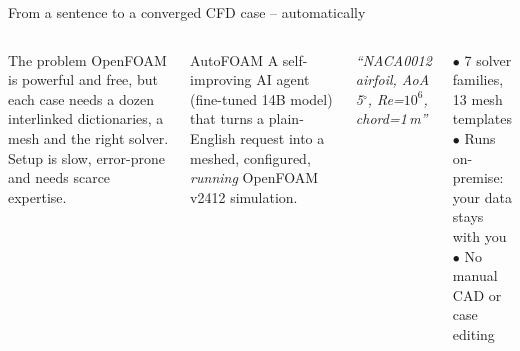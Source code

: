 \documentclass[aspectratio=169,11pt]{beamer}
\begin{document}
\begin{frame}{From a sentence to a converged CFD case -- automatically}
\begin{columns}[T]
\begin{block}{The problem}
\small OpenFOAM is powerful and free, but each case needs a dozen interlinked dictionaries, a mesh and the right solver. Setup is slow, error-prone and needs scarce expertise.
\end{block}
\begin{block}{AutoFOAM}
\small A self-improving AI agent (fine-tuned 14B model) that turns a plain-English request into a meshed, configured, \emph{running} OpenFOAM v2412 simulation.
\end{block}
\vspace{2pt}\small\textit{``NACA0012 airfoil, AoA 5$^\circ$, Re=$10^6$, chord=1\,m''}
\centering
{}

\vspace{.4cm}
\begin{minipage}{.95\linewidth}\small
$\bullet$ 7 solver families, 13 mesh templates\\
$\bullet$ Runs on-premise: your data stays with you\\
$\bullet$ No manual CAD or case editing
\end{minipage}
\end{columns}
\end{frame}
\end{document}
